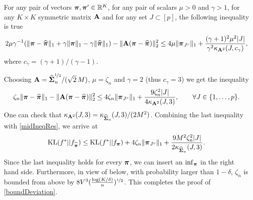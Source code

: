 \begin{lemma}
	For any pair of vectors $\boldsymbol \pi,\boldsymbol \pi'\in{\mathbb R}^K$, for any pair of scalars $\mu>0$ and $\gamma>1$, for any $K\times K$
	symmetric matrix $\mathbf A$ and for any set $J \subset [p]$, the following inequality is true
	\begin{equation}
	2\mu\gamma^{-1}(\| \boldsymbol \pi-\widehat{\boldsymbol \pi}\|_1 + \gamma \|\boldsymbol \pi\|_1 - \gamma \|\widehat{\boldsymbol \pi}\|_1 )-\|\mathbf A(\boldsymbol \pi-\widehat{\boldsymbol \pi})\|_2^2 \leq
	4\mu \| \boldsymbol \pi_{J^c}\|_1 + \frac{(\gamma+1)^2\mu^2|J|}{\gamma^2\kappa_{\mathbf A^2}(J,c_{\gamma})},
	\end{equation}
	where $c_{\gamma}=(\gamma+1)/(\gamma-1)$.
\end{lemma}


Choosing $\mathbf A = \widehat{\boldsymbol\Sigma}_n^{\nicefrac12}/(\sqrt{2}\,M)$, $\mu=\zeta_n$ and $\gamma=2$ (thus $c_\gamma = 3$)
we get the inequality
\begin{equation}
\zeta_n\| \boldsymbol \pi-\widehat{\boldsymbol \pi}\|_1-\|\mathbf A(\boldsymbol \pi-\widehat{\boldsymbol \pi})\|_2^2 \leq
4\zeta_n\| \boldsymbol \pi_{J^c}\|_1 + \frac{9\zeta_n^2|J|}{4\kappa_{\mathbf A^2}(J,3)},\qquad \forall J \in \{1, \dots, p\}.
\end{equation}
One can check that $\kappa_{\mathbf A^2}(J,3) = \kappa_{\widehat{\boldsymbol\Sigma}_n}(J,3)/(2M^2)$.
Combining the last inequality with \eqref{midIneqRes}, we arrive at
\begin{equation}
\label{oracleIneqTh}
{\rm KL}(f^*|| f_{\widehat{\boldsymbol \pi}}) \leq {\rm KL}(f^*|| f_{\boldsymbol \pi}) + 4\zeta_n\| \boldsymbol \pi_{J^c}\|_1 + \frac{9M^2\zeta_n^2|J|}{2\kappa_{\widehat{\boldsymbol\Sigma}_n}(J,3)}.
\end{equation}
Since the last inequality holds for every $\boldsymbol \pi$, we can insert an $\inf_{\boldsymbol \pi}$ in the right hand side.
Furthermore, in view of  below, with probability larger than $1-\delta$, $\zeta_n$ is bounded from above
by $8V^3(\frac{\log(K/\delta)}{n})^{\nicefrac12}$. This completes the proof of \eqref{boundDeviation}.

